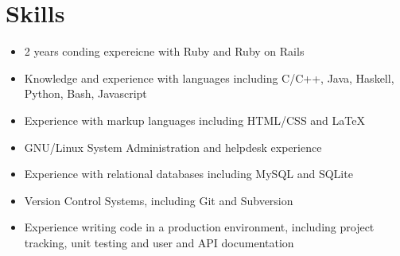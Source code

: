 \documentclass[10pt,letterpaper]{article} %
\begin{document}
    \section*{Skills} 
        \begin{itemize}
        \item 2 years conding expereicne with Ruby and Ruby on Rails 
        \item Knowledge and experience with languages including C/C++, Java, Haskell, Python, Bash, Javascript    
        \item Experience with markup languages including HTML/CSS and LaTeX 
        \item GNU/Linux System Administration and helpdesk experience
        \item Experience with relational databases including MySQL and SQLite
        \item Version Control Systems, including Git and Subversion
        \item Experience writing code in a production environment, including project tracking, unit testing and user and API documentation
        \end{itemize}          
\end{document}
